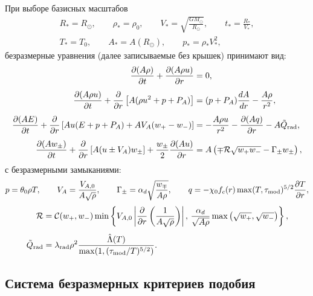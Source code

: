 \documentclass[11pt,a4paper]{article}
\begin{document}
При выборе базисных масштабов
\begin{equation}
\begin{gathered}
R_* = R_\odot, \qquad \rho_* = \rho_0, \qquad V_* = \sqrt{\frac{GM_\odot}{R_\odot}}, \qquad t_* = \frac{R_*}{V_*}, \\
T_* = T_0, \qquad A_* = A(R_\odot), \qquad p_* = \rho_* V_*^2,
\end{gathered}
\label{eq:scales_base}
\end{equation}
безразмерные уравнения (далее записываемые без крышек) принимают вид:
\begin{align}
\frac{\partial(A\rho)}{\partial t} + \frac{\partial(A\rho u)}{\partial r} &= 0,
\label{eq:nd_mass}\\[4pt]
\frac{\partial(A\rho u)}{\partial t} + \frac{\partial}{\partial r}\left[A(\rho u^2 + p + P_A)\right] &= (p + P_A)\frac{dA}{dr} - \frac{A\rho}{r^2},
\label{eq:nd_mom}\\[4pt]
\frac{\partial(A E)}{\partial t} + \frac{\partial}{\partial r}\left[A u(E + p + P_A) + A V_A(w_+ - w_-)\right] &= -\frac{A\rho u}{r^2} - \frac{\partial(A q)}{\partial r} - A\tilde{Q}_{\rm rad},
\label{eq:nd_energy}\\[4pt]
\frac{\partial(A w_\pm)}{\partial t} + \frac{\partial}{\partial r}\left[A(u \pm V_A)w_\pm\right] + \frac{w_\pm}{2}\frac{\partial(Au)}{\partial r} &= A\left(\mp\mathcal{R}\sqrt{w_+ w_-} - \Gamma_\pm w_\pm\right),
\label{eq:nd_waves}
\end{align}
с безразмерными замыканиями:
\begin{equation}
p = \theta_0\rho T, \qquad
V_A = \frac{V_{A,0}}{A\sqrt{\rho}}, \qquad
\Gamma_\pm = \alpha_d\sqrt{\frac{w_\mp}{A\rho}}, \qquad
q = -\chi_0 f_c(r)\max(T, \tau_{\rm mod})^{5/2}\frac{\partial T}{\partial r},
\label{eq:dimless_closures}
\end{equation}
\begin{equation}
\begin{aligned}
\mathcal{R} &= \mathcal{C}(w_+, w_-)\min\left\{V_{A,0}\left|\frac{\partial}{\partial r}\left(\frac{1}{A\sqrt{\rho}}\right)\right|,\, \frac{\alpha_d}{\sqrt{A\rho}}\max\left(\sqrt{w_+}, \sqrt{w_-}\right)\right\}, \\[4pt]
\tilde{Q}_{\rm rad} &= \lambda_{\rm rad}\rho^2 \frac{\hat{\Lambda}(T)}{\max(1, (\tau_{\rm mod}/T)^{5/2})}.
\end{aligned}
\label{eq:dimless_R}
\end{equation}

\subsection{Система безразмерных критериев подобия}
\end{document}
